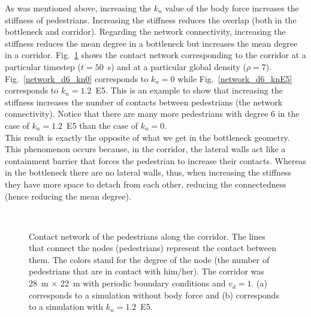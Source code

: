 \documentclass[preprint,12pt]{elsarticle}
\begin{document}
As was mentioned above, increasing the $k_n$ value of the body force increases the stiffness of pedestrians. Increasing the stiffness reduces the overlap (both in the bottleneck and corridor). Regarding the network connectivity, increasing the stiffness reduces the mean degree in a bottleneck but increases the mean degree in a corridor. Fig.~\ref{network_corridor} shows the contact network corresponding to the corridor at a particular timestep ($t=50$~s) and at a particular global density ($\rho=7$). Fig.~\ref{network_d6_kn0} corresponds to $k_n=0$ while Fig.~\ref{network_d6_knE5} corresponds to $k_n=1.2$~E5. This is an example to show that increasing the stiffness increases the number of contacts between pedestrians (the network connectivity). Notice that there are many more pedestrians with degree 6 in the case of $k_n=1.2$~E5 than the case of $k_n=0$. \\

This result is exactly the opposite of what we get in the bottleneck geometry. This phenomenon occurs because, in the corridor, the lateral walls act like a containment barrier that forces the pedestrian to increase their contacts. Whereas in the bottleneck there are no lateral walls, thus, when increasing the stiffness they have more space to detach from each other, reducing the connectedness (hence reducing the mean degree). \\

\begin{figure}[!htbp]
\centering
    \ 
    \\
\caption[width=0.47\columnwidth]{Contact network of the pedestrians along the corridor. The lines that connect the nodes (pedestrians) represent the contact between them. The colors stand for the degree of the node (the number of pedestrians that are in contact with him/her). The corridor was 28~m $\times$ 22~m with periodic boundary conditions and $v_d=1$. (a) corresponds to a simulation without body force and (b) corresponds to a simulation with $k_n=1.2$~E5.}
\label{network_corridor}
\end{figure}
\end{document}
